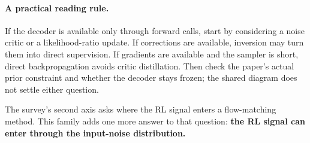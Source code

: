 \paragraph{A practical reading rule.} If the decoder is available only through forward calls, start by considering a noise critic or a likelihood-ratio update. If corrections are available, inversion may turn them into direct supervision. If gradients are available and the sampler is short, direct backpropagation avoids critic distillation. Then check the paper's actual prior constraint and whether the decoder stays frozen; the shared diagram does not settle either question.

The survey's second axis asks where the RL signal enters a flow-matching method. This family adds one more answer to that question: \textbf{the RL signal can enter through the input-noise distribution.}

